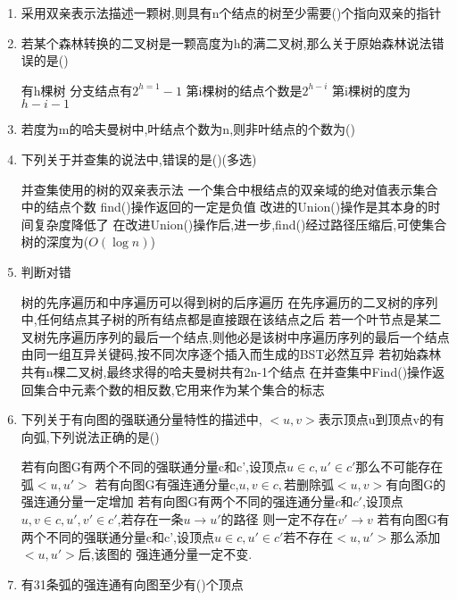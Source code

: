 \documentclass[12pt, a4paper, oneside, UTF8]{ctexbook}
\begin{document}
\begin{enumerate}
    \item 采用双亲表示法描述一颗树,则具有n个结点的树至少需要(\qquad)个指向双亲的指针
    \item 若某个森林转换的二叉树是一颗高度为h的满二叉树,那么关于原始森林说法错误的是(\qquad)
    \begin{choices}[2]
        \task 有h棵树 
        \task 分支结点有$2^{h=1}-1$
        \task 第i棵树的结点个数是$2^{h-i}$
        \task 第i棵树的度为$h-i-1$
    \end{choices}
    \item 若度为m的哈夫曼树中,叶结点个数为n,则非叶结点的个数为(\qquad)
    \item 下列关于并查集的说法中,错误的是(\qquad)(多选)
    \begin{choices}[1]
        \task 并查集使用的树的双亲表示法
        \task 一个集合中根结点的双亲域的绝对值表示集合中的结点个数
        \task find()操作返回的一定是负值
        \task 改进的Union()操作是其本身的时间复杂度降低了
        \task 在改进Union()操作后,进一步,find()经过路径压缩后,可使集合树的深度为($O(\log{n})$)
    \end{choices}
    \item 判断对错
    \begin{choices}[1]
        \task 树的先序遍历和中序遍历可以得到树的后序遍历
        \task 在先序遍历的二叉树的序列中,任何结点其子树的所有结点都是直接跟在该结点之后
        \task 若一个叶节点是某二叉树先序遍历序列的最后一个结点,则他必是该树中序遍历序列的最后一个结点
        \task 由同一组互异关键码,按不同次序逐个插入而生成的BST必然互异
        \task 若初始森林共有n棵二叉树,最终求得的哈夫曼树共有2n-1个结点
        \task 在并查集中Find()操作返回集合中元素个数的相反数,它用来作为某个集合的标志
    \end{choices}
    \item 下列关于有向图的强联通分量特性的描述中, $<u,v>$表示顶点u到顶点v的有向弧,下列说法正确的是(\qquad) 
    \begin{choices}[1]
        \task 若有向图G有两个不同的强联通分量c和c',设顶点$u\in c, u'\in c'$那么不可能存在弧$<u,u'>$
        \task 若有向图G有强连通分量c,$u,v\in c,$若删除弧$<u,v>$有向图G的强连通分量一定增加
        \task 若有向图G有两个不同的强连通分量$c$和$c'$,设顶点$u,v \in c, u', v' \in c'$,若存在一条$u\to u'$的路径
        则一定不存在$v'\to v$ 
        \task 若有向图G有两个不同的强联通分量c和c',设顶点$u\in c, u'\in c'$若不存在$<u,u'>$那么添加$<u,u'>$后,该图的
        强连通分量一定不变.
    \end{choices}
    \item 有31条弧的强连通有向图至少有(\qquad)个顶点

\end{enumerate}
\end{document}

